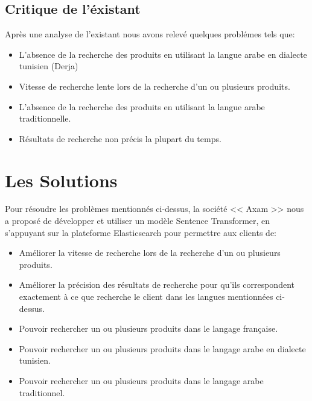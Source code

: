 \subsection{Critique de l'éxistant}
\noindent
Après une analyse de l'existant nous avons relevé quelques problémes tels que:

\renewcommand\labelitemi{$\bullet$}
\begin{itemize}
    \item L'absence de la recherche des produits en utilisant la langue arabe en dialecte tunisien (Derja) 
    \item Vitesse de recherche lente lors de la recherche d'un ou plusieurs produits.
    \item L'absence de la recherche des produits en utilisant la langue arabe traditionnelle.
    \item Résultats de recherche non précis la plupart du temps.
\end{itemize}

\newpage
\section{Les Solutions}
\noindent
Pour résoudre les problèmes mentionnés ci-dessus, la société << Axam >> nous a proposé de développer et utiliser un modèle Sentence Transformer, en s'appuyant sur la plateforme Elasticsearch pour permettre aux clients de:

\renewcommand\labelitemi{$\bullet$}
\begin{itemize}
    \item Améliorer la vitesse de recherche lors de la recherche d’un ou plusieurs produits.

    \item Améliorer la précision des résultats de recherche pour qu'ils correspondent exactement à ce que recherche le client dans les langues mentionnées ci-dessus.

    \item Pouvoir rechercher un ou plusieurs produits dans le langage française.

    \item Pouvoir rechercher un ou plusieurs produits dans le langage arabe en dialecte tunisien.

    \item Pouvoir rechercher un ou plusieurs produits dans le langage arabe traditionnel.
\end{itemize}